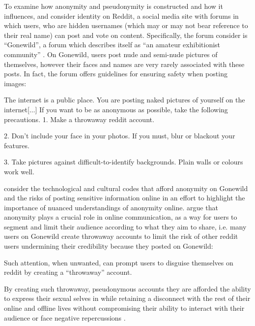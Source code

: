 To examine how anonymity and pseudonymity is constructed and how it influences, \cite{Nagel:2015} and \cite{Nagel:2013} consider identity on Reddit, a social media site with forums in which users, who are hidden usernames (which may or may not bear reference to their real name) can post and vote on content. Specifically, the forum \cite{Nagel:2013,Nagel:2015} consider is ``Gonewild'', a forum which describes itself as ``an amateur exhibitionist community'' \citep{Nagel:2015}. On Gonewild, users post nude and semi-nude pictures of themselves, however their faces and names are very rarely associated with these posts. In fact, the forum offers guidelines for ensuring safety when posting images:

\begin{aquote}{\cite{Nagel:2013}}
The internet is a public place. You are posting naked pictures of yourself on the internet[$\ldots$] If you want to be as anonymous as possible, take the following precautions.
1. Make a throwaway reddit account.

2. Don't include your face in your photos. If you must, blur or blackout your features.

3. Take pictures against difficult-to-identify backgrounds. Plain walls or colours work well. 
\end{aquote}

\cite{Nagel:2013} consider the technological and cultural codes that afford anonymity on Gonewild and the risks of posting sensitive information online in an effort to highlight the importance of nuanced understandings of anonymity online. \cite{Nagel:2013} argue that anonymity plays a crucial role in online communication, as a way for users to segment and limit their audience according to what they aim to share, i.e. many users on Gonewild create throwaway accounts to limit the risk of other reddit users undermining their credibility because they posted on Gonewild:

\begin{aquote}{\cite{Nagel:2013}}
Such attention, when unwanted, can prompt users to disguise themselves on reddit by creating a ``throwaway'' account.
\end{aquote}

By creating such throwaway, pseudonymous accounts they are afforded the ability to express their sexual selves in while retaining a disconnect with the rest of their online and offline lives without compromising their ability to interact with their audience or face negative repercussions \citep{Nagel:2015}.\vspace{5mm}

